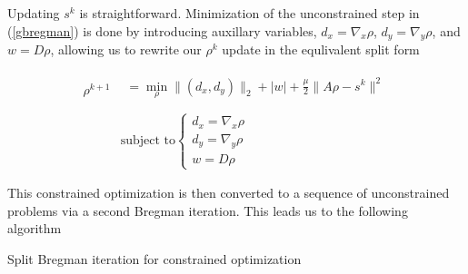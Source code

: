 \documentclass[11pt]{amsart}
\theoremstyle{remark}
\begin{document}
Updating $s^k$ is straightforward. Minimization of the unconstrained step in (\ref{gbregman}) is done by introducing auxillary variables, $d_x = \nabla_x \rho$, $d_y = \nabla_y \rho$, and $w = D\rho$, allowing us to rewrite our $\rho^k$ update in the equlivalent split form

\begin{align}\label{spilt}
    \rho^{k+1} & \left.\begin{array}{l} = \min_\rho \|(d_x,d_y)\|_2 + | w | + \frac{\mu}{2} \| A\rho - s^k \|^2 \\ \end{array}\right. \\
        & 
\text{subject to} \left\{ \begin{array}{l}
       d_x = \nabla_x \rho  \\
       d_y = \nabla_y \rho  \\
       w = D \rho
    \end{array}\right. 
\end{align}

This constrained optimization is then converted to a sequence of unconstrained problems via a second Bregman iteration. This leads us to the following algorithm

\begin{algorithm}[H]
\caption{Split Bregman iteration for constrained optimization}
\label{sbalgo}


\end{algorithm}
\end{document}
